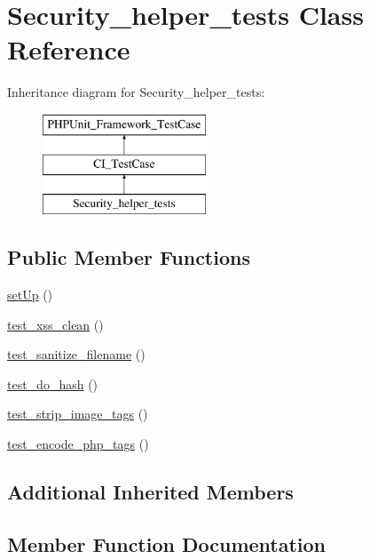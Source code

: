 \hypertarget{class_security__helper__tests}{}\section{Security\+\_\+helper\+\_\+tests Class Reference}
\label{class_security__helper__tests}
Inheritance diagram for Security\+\_\+helper\+\_\+tests\+:\begin{figure}[H]
\begin{center}
\leavevmode
\includegraphics[height=3.000000cm]{class_security__helper__tests}
\end{center}
\end{figure}
\subsection*{Public Member Functions}
\begin{DoxyCompactItemize}
\item 
\hyperlink{class_security__helper__tests_a0bc688732d2b3b162ffebaf7812e78da}{set\+Up} ()
\item 
\hyperlink{class_security__helper__tests_a0b11d7a4927affa03666d3d4accf569e}{test\+\_\+xss\+\_\+clean} ()
\item 
\hyperlink{class_security__helper__tests_aabbe49726ad10a764f190e82e21b536b}{test\+\_\+sanitize\+\_\+filename} ()
\item 
\hyperlink{class_security__helper__tests_a384c22b0dd5dc5c701b59e193eff7650}{test\+\_\+do\+\_\+hash} ()
\item 
\hyperlink{class_security__helper__tests_a4083449f38dadb00115cc8fc1a905056}{test\+\_\+strip\+\_\+image\+\_\+tags} ()
\item 
\hyperlink{class_security__helper__tests_a8ca70f14c2d624396a15507f7f884aa3}{test\+\_\+encode\+\_\+php\+\_\+tags} ()
\end{DoxyCompactItemize}
\subsection*{Additional Inherited Members}


\subsection{Member Function Documentation}
\hypertarget{class_security__helper__tests_a0bc688732d2b3b162ffebaf7812e78da}{}
